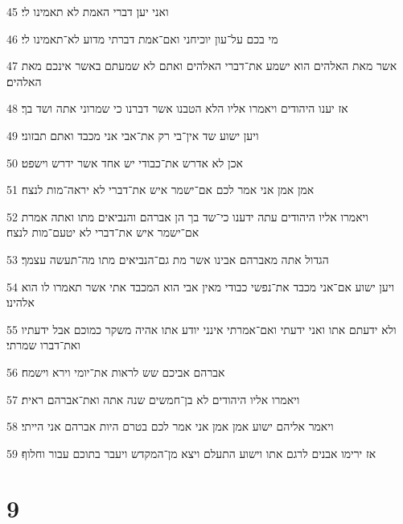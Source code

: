 \par 45 ואני יען דברי האמת לא תאמינו לי׃
\par 46 מי בכם על־עון יוכיחני ואם־אמת דברתי מדוע לא־תאמינו לי׃
\par 47 אשר מאת האלהים הוא ישמע את־דברי האלהים ואתם לא שמעתם באשר אינכם מאת האלהים׃
\par 48 אז יענו היהודים ויאמרו אליו הלא הטבנו אשר דברנו כי שמרוני אתה ושד בך׃
\par 49 ויען ישוע שד אין־בי רק את־אבי אני מכבד ואתם תבזוני׃
\par 50 אכן לא אדרש את־כבודי יש אחד אשר ידרש וישפט׃
\par 51 אמן אמן אני אמר לכם אם־ישמר איש את־דברי לא יראה־מות לנצח׃
\par 52 ויאמרו אליו היהודים עתה ידענו כי־שד בך הן אברהם והנביאים מתו ואתה אמרת אם־ישמר איש את־דברי לא יטעם־מות לנצח׃
\par 53 הגדול אתה מאברהם אבינו אשר מת גם־הנביאים מתו מה־תעשה עצמך׃
\par 54 ויען ישוע אם־אני מכבד את־נפשי כבודי מאין אבי הוא המכבד אתי אשר תאמרו לו הוא אלהינו׃
\par 55 ולא ידעתם אתו ואני ידעתי ואם־אמרתי אינני יודע אתו אהיה משקר כמוכם אבל ידעתיו ואת־דברו שמרתי׃
\par 56 אברהם אביכם שש לראות את־יומי וירא וישמח׃
\par 57 ויאמרו אליו היהודים לא בן־חמשים שנה אתה ואת־אברהם ראית׃
\par 58 ויאמר אליהם ישוע אמן אמן אני אמר לכם בטרם היות אברהם אני הייתי׃
\par 59 אז ירימו אבנים לרגם אתו וישוע התעלם ויצא מן־המקדש ויעבר בתוכם עבור וחלוף׃

\chapter{9}

